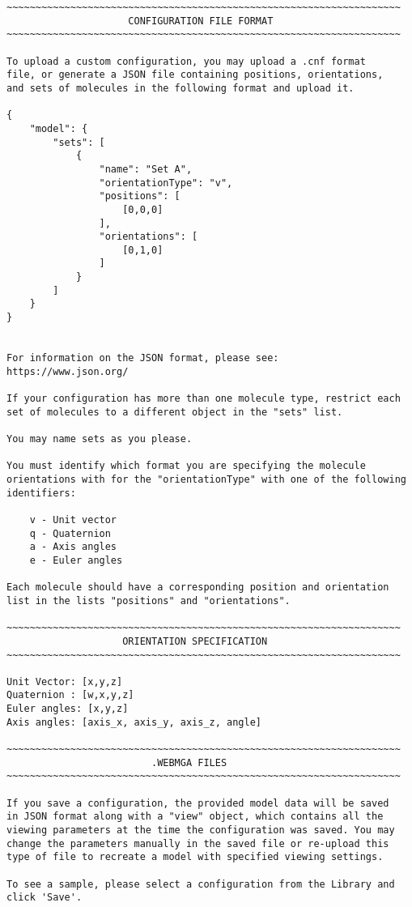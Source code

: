 \begin{lstlisting}
~~~~~~~~~~~~~~~~~~~~~~~~~~~~~~~~~~~~~~~~~~~~~~~~~~~~~~~~~~~~~~~~~~~~
                     CONFIGURATION FILE FORMAT
~~~~~~~~~~~~~~~~~~~~~~~~~~~~~~~~~~~~~~~~~~~~~~~~~~~~~~~~~~~~~~~~~~~~

To upload a custom configuration, you may upload a .cnf format
file, or generate a JSON file containing positions, orientations,
and sets of molecules in the following format and upload it.

{
    "model": {
        "sets": [
            {
                "name": "Set A",
                "orientationType": "v",
                "positions": [
                    [0,0,0]
                ],
                "orientations": [
                    [0,1,0]
                ]
            }
        ]
    }
}


For information on the JSON format, please see:
https://www.json.org/

If your configuration has more than one molecule type, restrict each
set of molecules to a different object in the "sets" list.

You may name sets as you please.

You must identify which format you are specifying the molecule
orientations with for the "orientationType" with one of the following
identifiers:

	v - Unit vector
	q - Quaternion
	a - Axis angles
	e - Euler angles

Each molecule should have a corresponding position and orientation
list in the lists "positions" and "orientations".

~~~~~~~~~~~~~~~~~~~~~~~~~~~~~~~~~~~~~~~~~~~~~~~~~~~~~~~~~~~~~~~~~~~~
                    ORIENTATION SPECIFICATION
~~~~~~~~~~~~~~~~~~~~~~~~~~~~~~~~~~~~~~~~~~~~~~~~~~~~~~~~~~~~~~~~~~~~

Unit Vector: [x,y,z]
Quaternion : [w,x,y,z]
Euler angles: [x,y,z]
Axis angles: [axis_x, axis_y, axis_z, angle]

~~~~~~~~~~~~~~~~~~~~~~~~~~~~~~~~~~~~~~~~~~~~~~~~~~~~~~~~~~~~~~~~~~~~
                         .WEBMGA FILES
~~~~~~~~~~~~~~~~~~~~~~~~~~~~~~~~~~~~~~~~~~~~~~~~~~~~~~~~~~~~~~~~~~~~

If you save a configuration, the provided model data will be saved
in JSON format along with a "view" object, which contains all the
viewing parameters at the time the configuration was saved. You may
change the parameters manually in the saved file or re-upload this
type of file to recreate a model with specified viewing settings.

To see a sample, please select a configuration from the Library and
click 'Save'.


\end{lstlisting}
